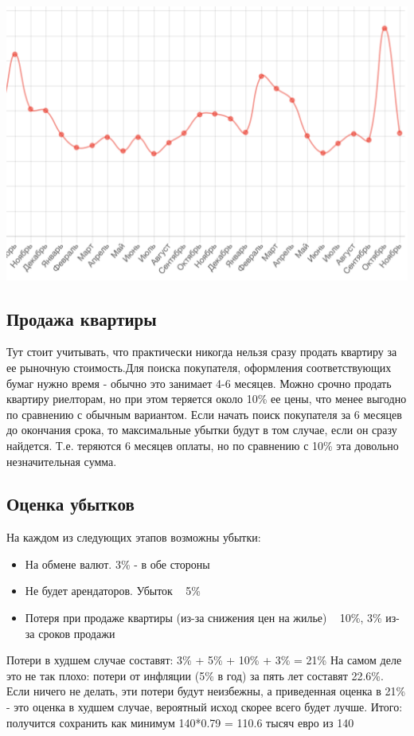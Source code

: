 \includegraphics[width=14.5cm]{pics/ruslan/3.png}

\subsection{Продажа квартиры}
Тут стоит учитывать, что практически никогда нельзя сразу продать квартиру за ее рыночную стоимость.Для поиска покупателя, оформления соответствующих бумаг нужно время - обычно это занимает 4-6 месяцев. Можно срочно продать квартиру риелторам, но при этом теряется около 10\% ее цены, что менее выгодно по сравнению с обычным вариантом. Если начать поиск покупателя за 6 месяцев до окончания срока, то максимальные убытки будут в том случае, если он сразу найдется. Т.е. теряются 6 месяцев оплаты, но по сравнению с 10\% эта довольно незначительная сумма.

\subsection{Оценка убытков}
На каждом из следующих этапов возможны убытки:
\begin{itemize}
	\item На обмене валют. 3\% - в обе стороны
	\item Не будет арендаторов. Убыток ~ 5\%
	\item Потеря при продаже квартиры (из-за снижения цен на жилье) ~ 10\%, 3\% из-за сроков продажи
\end{itemize}
Потери в худшем случае составят: 3\% + 5\% + 10\% + 3\% = 21\%
На самом деле это не так плохо: потери от инфляции (5\% в год) за пять лет составят 22.6\%. Если ничего не делать, эти потери будут неизбежны, а приведенная оценка в 21\% - это оценка в худшем случае, вероятный исход скорее всего будет лучше.
Итого: получится сохранить как минимум 140*0.79 = 110.6 тысяч евро из 140